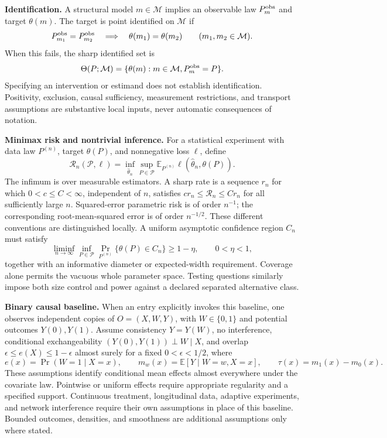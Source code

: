 \documentclass[11pt,a4paper]{article}
\newcommand{\E}{\mathbb E}
\begin{document}
\textbf{Identification.}
A structural model $m\in\mathcal M$ implies an observable law
$P_m^{\rm obs}$ and target $\theta(m)$. The target is point identified on
$\mathcal M$ if
\[
 P_{m_1}^{\rm obs}=P_{m_2}^{\rm obs}
 \quad\Longrightarrow\quad\theta(m_1)=\theta(m_2)
 \qquad(m_1,m_2\in\mathcal M).
\]
When this fails, the sharp identified set is
\[
 \Theta(P;\mathcal M)=\{\theta(m):m\in\mathcal M,
                                  P_m^{\rm obs}=P\}.
\]
Specifying an intervention or estimand does not establish identification.
Positivity, exclusion, causal sufficiency, measurement restrictions, and
transport assumptions are substantive local inputs, never automatic
consequences of notation.

\textbf{Minimax risk and nontrivial inference.}
For a statistical experiment with data law $P^{(n)}$, target $\theta(P)$,
and nonnegative loss $\ell$, define
\[
 \mathcal R_n(\mathcal P,\ell)
   =\inf_{\widehat\theta_n}\sup_{P\in\mathcal P}
      \E_{P^{(n)}}\ell(\widehat\theta_n,\theta(P)).
\]
The infimum is over measurable estimators. A sharp rate is a sequence
$r_n$ for which $0<c\leq C<\infty$, independent of $n$, satisfies
$c r_n\leq\mathcal R_n\leq C r_n$ for all sufficiently large $n$.
Squared-error parametric risk is of order $n^{-1}$; the corresponding
root-mean-squared error is of order $n^{-1/2}$. These different conventions
are distinguished locally. A uniform asymptotic confidence region $C_n$
must satisfy
\[
 \liminf_{n\to\infty}\inf_{P\in\mathcal P}
     \Pr_{P^{(n)}}\{\theta(P)\in C_n\}\geq 1-\eta,
 \qquad 0<\eta<1,
\]
together with an informative diameter or expected-width requirement.
Coverage alone permits the vacuous whole parameter space. Testing questions
similarly impose both size control and power against a declared separated
alternative class.

\textbf{Binary causal baseline.}
When an entry explicitly invokes this baseline, one observes independent
copies of $O=(X,W,Y)$, with $W\in\{0,1\}$ and potential outcomes $Y(0),Y(1)$.
Assume consistency $Y=Y(W)$, no interference, conditional exchangeability
$(Y(0),Y(1))\perp W\mid X$, and overlap
$\epsilon\leq e(X)\leq1-\epsilon$ almost surely for a fixed
$0<\epsilon<1/2$, where
\[
 e(x)=\Pr(W=1\mid X=x),\qquad
 m_w(x)=\E[Y\mid W=w,X=x],\qquad
 \tau(x)=m_1(x)-m_0(x).
\]
These assumptions identify conditional mean effects almost everywhere
under the covariate law. Pointwise or uniform effects require appropriate
regularity and a specified support. Continuous treatment, longitudinal
data, adaptive experiments, and network interference require their own
assumptions in place of this baseline. Bounded outcomes, densities, and
smoothness are additional assumptions only where stated.
\end{document}
